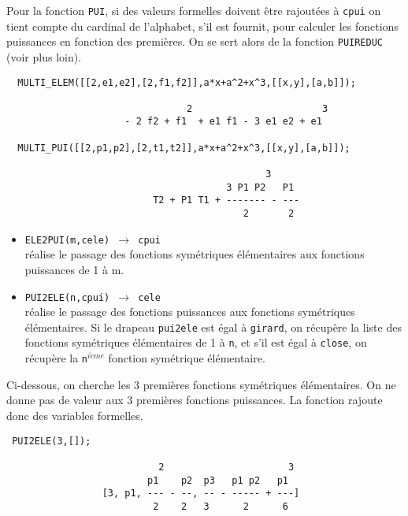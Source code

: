 Pour la fonction {\tt PUI}, si des valeurs formelles doivent
\^{e}tre rajout\'{e}es \`{a}
{\tt cpui} on tient compte du cardinal de l'alphabet, s'il est
fournit, pour calculer les fonctions puissances en fonction des 
premi\`{e}res. On se sert alors de la fonction {\tt PUIREDUC} (voir
plus loin).
\small
\begin{verbatim}
  MULTI_ELEM([[2,e1,e2],[2,f1,f2]],a*x+a^2+x^3,[[x,y],[a,b]]);

                                2                       3
                     - 2 f2 + f1  + e1 f1 - 3 e1 e2 + e1

  MULTI_PUI([[2,p1,p2],[2,t1,t2]],a*x+a^2+x^3,[[x,y],[a,b]]);
    
                                              3
                                       3 P1 P2   P1
                          T2 + P1 T1 + ------- - ---
                                          2       2
\end{verbatim}
\normalsize
\begin{itemize}
\item {\tt ELE2PUI(m,cele) 
$\longrightarrow$ cpui}\\
 r\'{e}alise le passage des fonctions 
sym\'{e}triques 
\'{e}l\'{e}mentaires aux fonctions puissances de 1 \`{a} m.

\item {\tt PUI2ELE(n,cpui) 
$\longrightarrow$ cele}\\
 r\'{e}alise le passage des fonctions 
puissances aux fonctions 
sym\'{e}triques \'{e}l\'{e}mentaires. Si le drapeau {\tt pui2ele} est
\'egal \`a 
{\tt girard}, on r\'ecup\`ere la liste des fonctions sym\'etriques
\'el\'ementaires de 1 \`{a} {\tt n}, et s'il est \'egal \`a {\tt close}, on
r\'ecup\`ere la {\tt n}$^{i\grave{e}me}$ fonction sym\'etrique
\'el\'ementaire.
\end{itemize}
Ci-dessous, on cherche les 3 premi\`{e}res fonctions sym\'{e}triques 
\'{e}l\'{e}mentaires.
   On ne donne pas de valeur aux 3 premi\`{e}res fonctions puissances. La
   fonction rajoute donc des variables formelles.
\small
\begin{verbatim}
 PUI2ELE(3,[]);

                           2                      3
                         p1    p2  p3   p1 p2   p1
                 [3, p1, --- - --, -- - ----- + ---]
                          2    2   3      2      6


\end{verbatim}
\normalsize
